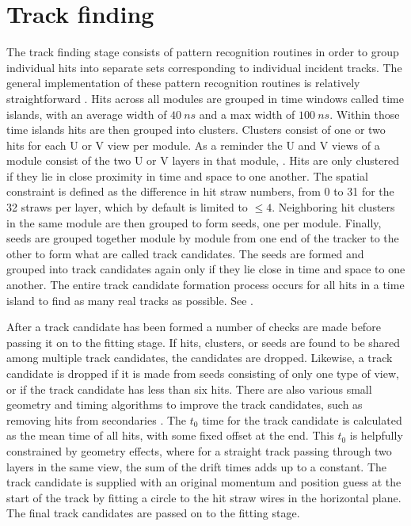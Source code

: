 \section{Track finding}
\label{sec:TrackFinding}

The track finding stage consists of pattern recognition routines in order to group individual hits into separate sets corresponding to individual incident tracks. The general implementation of these pattern recognition routines is relatively straightforward \cite{trackfinding,trackfinding2}. Hits across all modules are grouped in time windows called time islands, with an average width of $\SI{40}{ns}$ and a max width of $\SI{100}{ns}$. Within those time islands hits are then grouped into clusters. Clusters consist of one or two hits for each U or V view per module. As a reminder the U and V views of a module consist of the two U or V layers in that module, . Hits are only clustered if they lie in close proximity in time and space to one another. The spatial constraint is defined as the difference in hit straw numbers, from 0 to 31 for the 32 straws per layer, which by default is limited to $\leq 4$. Neighboring hit clusters in the same module are then grouped to form seeds, one per module. Finally, seeds are grouped together module by module from one end of the tracker to the other to form what are called track candidates. The seeds are formed and grouped into track candidates again only if they lie close in time and space to one another. The entire track candidate formation process occurs for all hits in a time island to find as many real tracks as possible. See .

After a track candidate has been formed a number of checks are made before passing it on to the fitting stage. If hits, clusters, or seeds are found to be shared among multiple track candidates, the candidates are dropped. Likewise, a track candidate is dropped if it is made from seeds consisting of only one type of view, or if the track candidate has less than six hits. There are also various small geometry and timing algorithms to improve the track candidates, such as removing hits from secondaries \cite{trackfinding3}. The $t_{0}$ time for the track candidate is calculated as the mean time of all hits, with some fixed offset at the end. This $t_{0}$ is helpfully constrained by geometry effects, where for a straight track passing through two layers in the same view, the sum of the drift times adds up to a constant. The track candidate is supplied with an original momentum and position guess at the start of the track by fitting a circle to the hit straw wires in the horizontal plane. The final track candidates are passed on to the fitting stage. 


